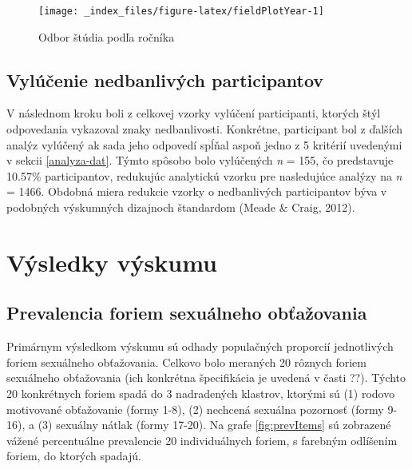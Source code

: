 \documentclass[
]{article}
\begin{document}
\begin{figure}

{\centering \texttt{[image: \_index\_files/figure-latex/fieldPlotYear-1]} 

}

\caption{Odbor štúdia podľa ročníka}\label{fig:fieldPlotYear}
\end{figure}

\hypertarget{vyluxfaux10denie-nedbanlivuxfdch-participantov}{%
\subsection{Vylúčenie nedbanlivých participantov}\label{vyluxfaux10denie-nedbanlivuxfdch-participantov}}

V následnom kroku boli z celkovej vzorky vylúčení participanti, ktorých štýl odpovedania vykazoval znaky nedbanlivosti. Konkrétne, participant bol z ďalších analýz vylúčený ak sada jeho odpovedí spĺňal aspoň jedno z 5 kritérií uvedenými v sekcii \ref{analyza-dat}. Týmto spôsobo bolo vylúčených \emph{n} = 155, čo predstavuje 10.57\% participantov, redukujúc analytickú vzorku pre nasledujúce analýzy na \emph{n} = 1466. Obdobná miera redukcie vzorky o nedbanlivých participantov býva v podobných výskumných dizajnoch štandardom (Meade \& Craig, 2012).

\newpage

\hypertarget{vysledky}{%
\section{Výsledky výskumu}\label{vysledky}}

\hypertarget{prevalencia-foriem-sexuuxe1lneho-obux165aux17eovania}{%
\subsection{Prevalencia foriem sexuálneho obťažovania}\label{prevalencia-foriem-sexuuxe1lneho-obux165aux17eovania}}

Primárnym výsledkom výskumu sú odhady populačných proporcií jednotlivých foriem sexuálneho obťažovania. Celkovo bolo meraných 20 rôznych foriem sexuálneho obťažovania (ich konkrétna špecifikácia je uvedená v časti ??). Týchto 20 konkrétnych foriem spadá do 3 nadradených klastrov, ktorými sú (1) rodovo motivované obťažovanie (formy 1-8), (2) nechcená sexuálna pozornosť (formy 9-16), a (3) sexuálny nátlak (formy 17-20). Na grafe \ref{fig:prevItems} sú zobrazené vážené percentuálne prevalencie 20 individuálnych foriem, s farebným odlíšením foriem, do ktorých spadajú.
\end{document}
